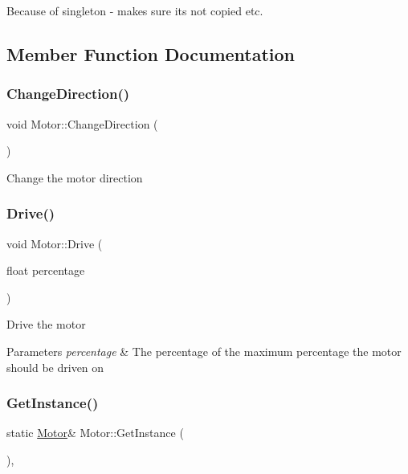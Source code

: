 Because of singleton -\/ makes sure its not copied etc. 

\subsection{Member Function Documentation}
\hypertarget{class_motor_a4b1fb35dcf10c3e17a1614877b9b6a7d}{}\label{class_motor_a4b1fb35dcf10c3e17a1614877b9b6a7d} 
\subsubsection{\texorpdfstring{Change\+Direction()}{ChangeDirection()}}
{\footnotesize\ttfamily void Motor\+::\+Change\+Direction (\begin{DoxyParamCaption}{ }\end{DoxyParamCaption})}

Change the motor direction \hypertarget{class_motor_a653f0e6158ce2d44a1b1704c1787d74b}{}\label{class_motor_a653f0e6158ce2d44a1b1704c1787d74b} 
\subsubsection{\texorpdfstring{Drive()}{Drive()}}
{\footnotesize\ttfamily void Motor\+::\+Drive (\begin{DoxyParamCaption}\item[{float}]{percentage }\end{DoxyParamCaption})}

Drive the motor 
\begin{DoxyParams}{Parameters}
{\em percentage} & The percentage of the maximum percentage the motor should be driven on \\
\hline
\end{DoxyParams}
\hypertarget{class_motor_a20fcd40b6fd58d4894310fb3b0df9b7a}{}\label{class_motor_a20fcd40b6fd58d4894310fb3b0df9b7a} 
\subsubsection{\texorpdfstring{Get\+Instance()}{GetInstance()}}
{\footnotesize\ttfamily static \hyperlink{class_motor}{Motor}\& Motor\+::\+Get\+Instance (\begin{DoxyParamCaption}{ }\end{DoxyParamCaption})\hspace{0.3cm}{\ttfamily [inline]}, {\ttfamily [static]}}

